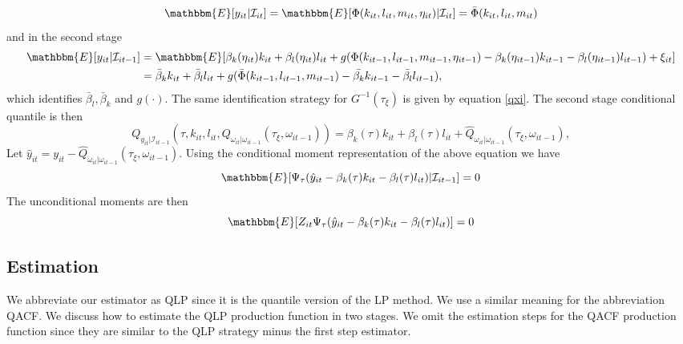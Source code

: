 \documentclass[11pt]{article}
\begin{document}
\begin{equation}\label{ACFmean1}
\mathbbm{E}[y_{it}|\mathcal{I}_{it}]=\mathbbm{E}[\Phi(k_{it}, l_{it}, m_{it}, \eta_{it})|\mathcal{I}_{it}]=\bar{\Phi}(k_{it}, l_{it}, m_{it})
\end{equation}
and in the second stage
\begin{equation}\label{ACFmean2}
\begin{split}
\mathbbm{E}[y_{it}|\mathcal{I}_{it-1}]&=\mathbbm{E}[\beta_{k}(\eta_{it})k_{it}+\beta_{l}(\eta_{it})l_{it}+g(\Phi(k_{it-1}, l_{it-1}, m_{it-1}, \eta_{it-1})-\beta_{k}(\eta_{it-1})k_{it-1}-\beta_{l}(\eta_{it-1})l_{it-1})+\xi_{it}]\\
&=\bar{\beta}_{k}k_{it}+\bar{\beta}_{l}l_{it}+g(\bar{\Phi}(k_{it-1}, l_{it-1}, m_{it-1})-\bar{\beta_{k}}k_{it-1}-\bar{\beta_{l}}l_{it-1}),
\end{split}
\end{equation}
which identifies $\bar{\beta}_{l}, \bar{\beta}_{k}$ and $g(\cdot)$. The same identification strategy for $G^{-1}(\tau_{\xi})$ is given by equation \eqref{qxi}. The second stage conditional quantile is then
\begin{equation*}
Q_{y_{it}|\mathcal{I}_{it-1}}(\tau, k_{it}, l_{it}, Q_{\omega_{it}|\omega_{it-1}}(\tau_{\xi}, \omega_{it-1}))=\beta_{k}(\tau)k_{it}+\beta_{l}(\tau)l_{it}+\hat{Q}_{\omega_{it}|\omega_{it-1}}(\tau_{\xi}, \omega_{it-1}),
\end{equation*}
Let $\hat{y}_{it}=y_{it}-\hat{Q}_{\omega_{it}|\omega_{it-1}}(\tau_{\xi}, \omega_{it-1})$. Using the conditional moment representation of the above equation we have
\begin{equation}
\mathbbm{E}[\Psi_{\tau}(\hat{y}_{it}-\beta_{k}(\tau)k_{it}-\beta_{l}(\tau)l_{it})|\mathcal{I}_{it-1}]=0
\end{equation}
The unconditional moments are then
\begin{equation}
\mathbbm{E}[Z_{it}\Psi_{\tau}(\hat{y}_{it}-\beta_{k}(\tau)k_{it}-\beta_{l}(\tau)l_{it})]=0
\end{equation}

\subsection{Estimation}
We abbreviate our estimator as QLP since it is the quantile version of the LP method. We use a similar meaning for the abbreviation QACF. We discuss how to estimate the QLP production function in two stages. We omit the estimation steps for the QACF production function since they are similar to the QLP strategy minus the first step estimator.
\end{document}
